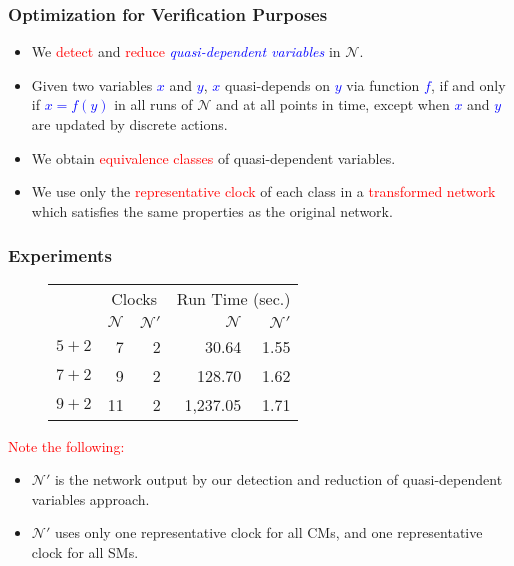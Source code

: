 \documentclass[serif]{beamer}
\begin{document}
\begin{frame}\frametitle{\textbf{Optimization for Verification Purposes}}
\begin{itemize}
	\item We \textcolor{red}{detect} and \textcolor{red}{reduce} 
				\emph{\textcolor{blue}{quasi-dependent variables}} in $\mathcal{N}$.
	\item Given two variables \textcolor{blue}{$x$} and \textcolor{blue}{$y$}, \textcolor{blue}{$x$} quasi-depends
on \textcolor{blue}{$y$} via function \textcolor{blue}{$f$}, if and only if \textcolor{blue}{$x=f(y)$} in all 
runs of $\mathcal{N}$ and at all points in time, except when \textcolor{blue}{$x$} and \textcolor{blue}{$y$} are updated by discrete actions.
	\item We obtain \textcolor{red}{equivalence classes} of quasi-dependent variables. 
	\item We use only the \textcolor{red}{representative clock} of each class in a 
				\textcolor{red}{transformed network} which satisfies the same properties as
				the original network.
\end{itemize}
\end{frame} 

\begin{frame}\frametitle{\textbf{Experiments}}
\begin{center}
\begin{figure} 
\begin{table}[t]%
  \centering
  \begin{tabular}[b]{|r||r|r||r|r|}
    \hline
    \multirow{2}{*}{} &
    \multicolumn{2}{|c||}{\scriptsize Clocks}  & 
    \multicolumn{2}{|c|}{\scriptsize Run Time (sec.)} 
    \\ 
    \scriptsize Components
    &\scriptsize $\mathcal{N}$ &\scriptsize $\mathcal{N}'$  
    &\scriptsize $\mathcal{N}$ &\scriptsize $\mathcal{N}'$ 
    \\    \hline\hline 
    \scriptsize $5 + 2$ & \scriptsize 7 & \scriptsize 2 &\scriptsize 30.64 
    &\scriptsize 1.55
    \\    \hline 
    \scriptsize $7 + 2$ & \scriptsize 9 & \scriptsize 2  &\scriptsize 128.70&\scriptsize 1.62
    \\    \hline 
    \scriptsize $9 + 2$ & \scriptsize 11 &\scriptsize 2 &\scriptsize 1,237.05 &\scriptsize 1.71
    \\    \hline 
  \end{tabular}
\end{table}%
\end{figure} 
\end{center}

\textcolor{red}{Note the following:} 
\begin{itemize}
	\item $\mathcal{N}'$ is the network output by our detection and reduction of quasi-dependent variables approach.
	\item $\mathcal{N}'$ uses only one representative clock for all CMs, and one representative clock for all SMs.
\end{itemize}  
\end{frame}
 
\end{document}

